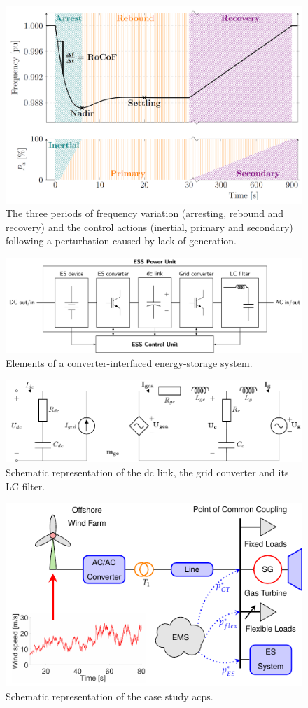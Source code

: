 \documentclass[utf8]{frontiersSCNS} %
\begin{document}
\begin{figure}[ht!]
	\centering
	\includegraphics[width=0.6\linewidth]{fig/freqctrl.png}
	\caption[]{The three periods of frequency variation (arresting, rebound and recovery) and the control actions (inertial, primary and secondary) following a perturbation caused by lack of generation.}
	\label{fig:freqctrl}
\end{figure}

\begin{figure}[ht!]
	\centering
	\includegraphics[width=0.8\linewidth]{fig/ess-overview.pdf}
	\caption[]{Elements of a converter-interfaced energy-storage system.}
	\label{fig:ess-overview}
\end{figure}

\begin{figure}[ht!]
	\centering
	\includegraphics[width=0.8\linewidth]{fig/grid-converter.pdf}
	\caption[]{Schematic representation of the dc link, the grid converter and its LC filter.}
	\label{fig:grid-converter}
\end{figure}

\begin{figure}[ht!]
	\centering
	\includegraphics[width=0.8\linewidth]{fig/case-study.pdf}
	\caption[]{Schematic representation of the case study \gls{acps}.}
	\label{fig:case-study}
\end{figure}
\end{document}

